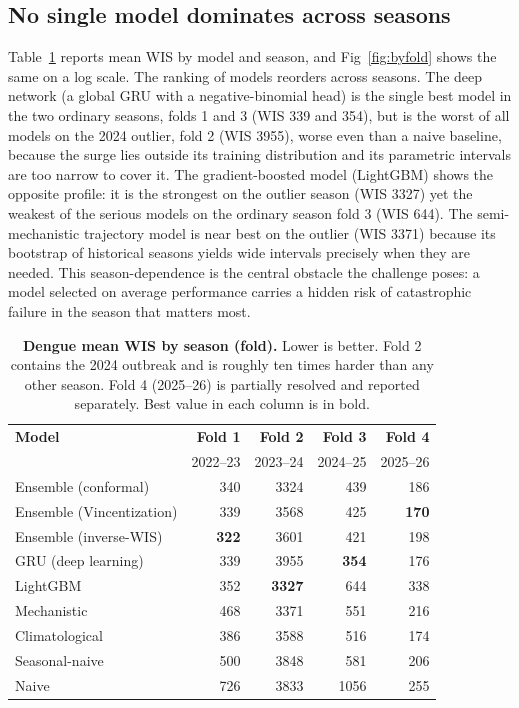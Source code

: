 \documentclass[11pt]{article}
\begin{document}
\subsection{No single model dominates across seasons}\label{sec:noseason}
Table~\ref{tab:byfold} reports mean WIS by model and season, and Fig~\ref{fig:byfold} shows the same
on a log scale. The ranking of models reorders across seasons. The deep network (a global GRU with a
negative-binomial head) is the single best model in the two ordinary seasons, folds 1 and 3 (WIS 339
and 354), but is the worst of all models on the 2024 outlier, fold 2 (WIS 3955), worse even than a
naive baseline, because the surge lies outside its training distribution and its parametric intervals
are too narrow to cover it. The gradient-boosted model (LightGBM) shows the opposite profile: it is
the strongest on the outlier season (WIS 3327) yet the weakest of the serious models on the ordinary
season fold 3 (WIS 644). The semi-mechanistic trajectory model is near best on the outlier (WIS 3371)
because its bootstrap of historical seasons yields wide intervals precisely when they are needed.
This season-dependence is the central obstacle the challenge poses: a model selected on average
performance carries a hidden risk of catastrophic failure in the season that matters most.

\begin{table}[t]
\centering\small
\caption{\textbf{Dengue mean WIS by season (fold).} Lower is better. Fold 2 contains the 2024
outbreak and is roughly ten times harder than any other season. Fold 4 (2025--26) is partially
resolved and reported separately. Best value in each column is in bold.}
\label{tab:byfold}
\begin{tabular}{@{}lrrrr@{}}
\toprule
\textbf{Model} & \textbf{Fold 1} & \textbf{Fold 2} & \textbf{Fold 3} & \textbf{Fold 4} \\
& 2022--23 & 2023--24 & 2024--25 & 2025--26 \\
\midrule
Ensemble (conformal)      & 340 & 3324 & 439 & 186 \\
Ensemble (Vincentization) & 339 & 3568 & 425 & \textbf{170} \\
Ensemble (inverse-WIS)    & \textbf{322} & 3601 & 421 & 198 \\
GRU (deep learning)       & 339 & 3955 & \textbf{354} & 176 \\
LightGBM                  & 352 & \textbf{3327} & 644 & 338 \\
Mechanistic               & 468 & 3371 & 551 & 216 \\
Climatological            & 386 & 3588 & 516 & 174 \\
Seasonal-naive            & 500 & 3848 & 581 & 206 \\
Naive                     & 726 & 3833 & 1056 & 255 \\
\bottomrule
\end{tabular}
\end{table}
\end{document}
